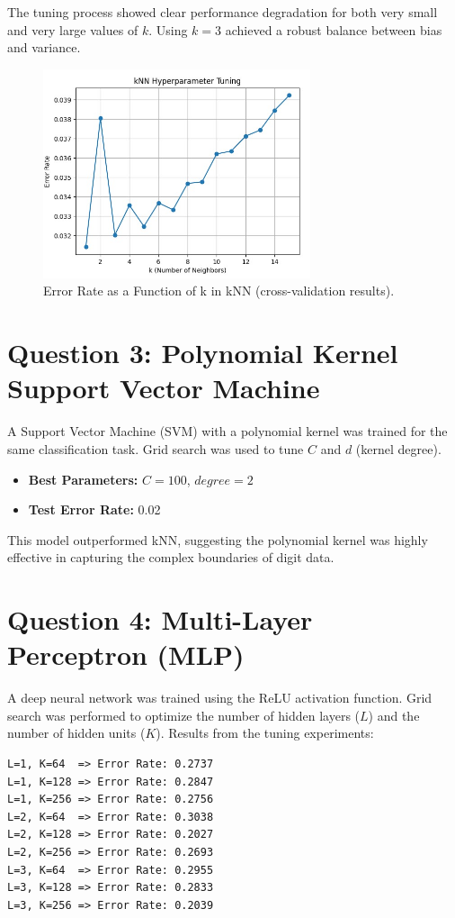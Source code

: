 \documentclass[a4paper,12pt]{article}
\begin{document}
The tuning process showed clear performance degradation for both very small and very large values of \(k\). Using \(k=3\) achieved a robust balance between bias and variance.
\begin{figure}[h!]
\centering
\includegraphics[width=0.7\textwidth]{knn_error_vs_k.png}
\caption{Error Rate as a Function of k in kNN (cross-validation results).}
\label{fig:knn_plot}
\end{figure}

\section*{Question 3: Polynomial Kernel Support Vector Machine}
A Support Vector Machine (SVM) with a polynomial kernel was trained for the same classification task. Grid search was used to tune \(C\) and \(d\) (kernel degree).

\begin{itemize}
  \item \textbf{Best Parameters:} $C=100$, $degree=2$
  \item \textbf{Test Error Rate:} 0.02
\end{itemize}

This model outperformed kNN, suggesting the polynomial kernel was highly effective in capturing the complex boundaries of digit data.

\section*{Question 4: Multi-Layer Perceptron (MLP)}
A deep neural network was trained using the ReLU activation function. Grid search was performed to optimize the number of hidden layers (\(L\)) and the number of hidden units (\(K\)). Results from the tuning experiments:

\begin{verbatim}
L=1, K=64  => Error Rate: 0.2737
L=1, K=128 => Error Rate: 0.2847
L=1, K=256 => Error Rate: 0.2756
L=2, K=64  => Error Rate: 0.3038
L=2, K=128 => Error Rate: 0.2027
L=2, K=256 => Error Rate: 0.2693
L=3, K=64  => Error Rate: 0.2955
L=3, K=128 => Error Rate: 0.2833
L=3, K=256 => Error Rate: 0.2039
\end{verbatim}
\end{document}
